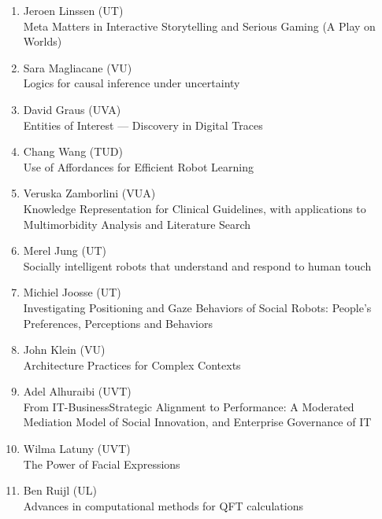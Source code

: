 \begin{multicols}{2}
\begin{scriptsize}
\begin{enumerate}[label=\textbf{2017-\arabic*},leftmargin=0cm,itemindent=1.15cm,labelwidth=\itemindent,labelsep=0cm,align=left,noitemsep]
	
\item Jeroen Linssen (UT)     \\
	Meta Matters in Interactive Storytelling and Serious Gaming (A Play on Worlds) 
\item Sara Magliacane (VU)     \\
	Logics for causal inference under uncertainty 
\item David Graus (UVA)     \\
	Entities of Interest --- Discovery in Digital Traces 
\item Chang Wang (TUD)    \\
	Use of Affordances for Efficient Robot Learning
	
\item Veruska Zamborlini (VUA)     \\
	Knowledge Representation for Clinical Guidelines, with applications to Multimorbidity Analysis and Literature Search 
\item Merel Jung (UT)     \\
	Socially intelligent robots that understand and respond to human touch
\item Michiel Joosse (UT)     \\
	Investigating Positioning and Gaze Behaviors of Social Robots: People's Preferences, Perceptions and Behaviors 
\item John Klein (VU)     \\
	Architecture Practices for Complex Contexts 
\item Adel Alhuraibi (UVT)     \\
	From IT-BusinessStrategic Alignment to Performance: A Moderated Mediation Model of Social Innovation, and Enterprise Governance of IT
\item Wilma Latuny (UVT)     \\
	The Power of Facial Expressions 
\item Ben Ruijl (UL)     \\
	Advances in computational methods for QFT calculations 


\end{enumerate}
\end{scriptsize}
\end{multicols}

